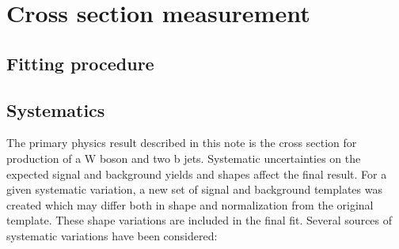 
\chapter{Cross section measurement} %

\label{Chapter7} %







\section{Fitting procedure}



\section{Systematics}

The primary physics result described in this note is the cross section for production of a W boson and two b
jets. Systematic uncertainties on the expected signal and background yields and shapes affect
the final result. For a given systematic variation, a new set of signal and background templates was created which may differ both in shape and normalization from the original template.  These shape variations are included in the final fit. Several sources of systematic variations have been considered:

